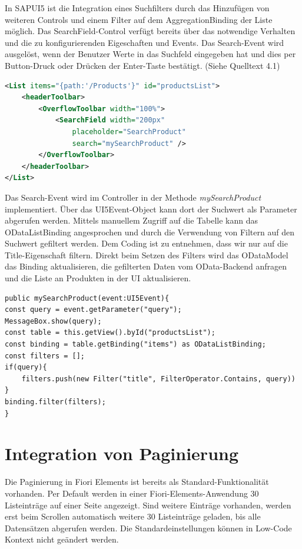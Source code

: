 In SAPUI5 ist die Integration eines Suchfilters durch das Hinzufügen von weiteren Controls und einem Filter auf dem AggregationBinding der Liste möglich. Das SearchField-Control verfügt bereits über das notwendige Verhalten und die zu konfigurierenden Eigeschaften und Events. Das Search-Event wird ausgelöst, wenn der Benutzer Werte in das Suchfeld eingegeben hat und dies per Button-Druck oder Drücken der Enter-Taste bestätigt. (Siehe Quelltext 4.1) 
\begin{lstlisting}[language=XML,  caption=Implementierung von Suchfilter in der \texttt{Main.view.xml}]
<List items="{path:'/Products'}" id="productsList">
	<headerToolbar>
		<OverflowToolbar width="100%">
			<SearchField width="200px" 
				placeholder="SearchProduct" 
				search="mySearchProduct" />
		</OverflowToolbar>
	</headerToolbar>
</List>
\end{lstlisting}

Das Search-Event wird im Controller in der Methode \textit{mySearchProduct} implementiert. Über das UI5Event-Object kann dort der Suchwert als Parameter abgerufen werden. Mittels manuellem Zugriff auf die Tabelle kann das ODataListBinding angesprochen und durch die Verwendung von Filtern auf den Suchwert gefiltert werden. Dem Coding ist zu entnehmen, dass wir nur auf die Title-Eigenschaft filtern. Direkt beim Setzen des Filters wird das ODataModel das Binding aktualisieren, die gefilterten Daten vom OData-Backend anfragen und die Liste an Produkten in der UI aktualisieren.
 
\begin{lstlisting}[emph={event, UI5Event, query, productsList, items, table, binding, filters},  caption=Implementation von Suchfilter in der \texttt{Main.controller.ts}]
public mySearchProduct(event:UI5Event){
const query = event.getParameter("query");
MessageBox.show(query);
const table = this.getView().byId("productsList");
const binding = table.getBinding("items") as ODataListBinding;
const filters = [];
if(query){
	filters.push(new Filter("title", FilterOperator.Contains, query))
}
binding.filter(filters);
}
\end{lstlisting}

\section{Integration von Paginierung}

Die Paginierung in Fiori Elements ist bereits als Standard-Funktionalität vorhanden. Per Default werden in einer Fiori-Elements-Anwendung 30 Listeinträge auf einer Seite angezeigt. Sind weitere Einträge vorhanden, werden erst beim Scrollen automatisch weitere 30 Listeinträge geladen, bis alle Datensätzen abgerufen werden. Die Standardeinstellungen können in Low-Code Kontext nicht geändert werden.

